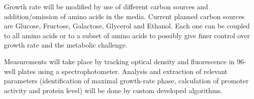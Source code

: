 \documentclass[a4page,notitlepage]{article}
\begin{document}
Growth rate will be modified by use of different carbon sources and addition/omission of amino acids in the media.
Current planned carbon sources are Glucose, Fructose, Galactose, Glycerol and Ethanol.
Each one can be coupled to all amino acids or to a subset of amino acids to possibly give finer control over growth rate and the metabolic challenge.

Measurements will take place by tracking optical density and fluorescence in 96-well plates using a spectrophotometer.
Analysis and extraction of relevant parameters (identification of maximal growth-rate phase, calculation of promoter activity and protein level) will be done by custom developed algorithms.


\end{document}

